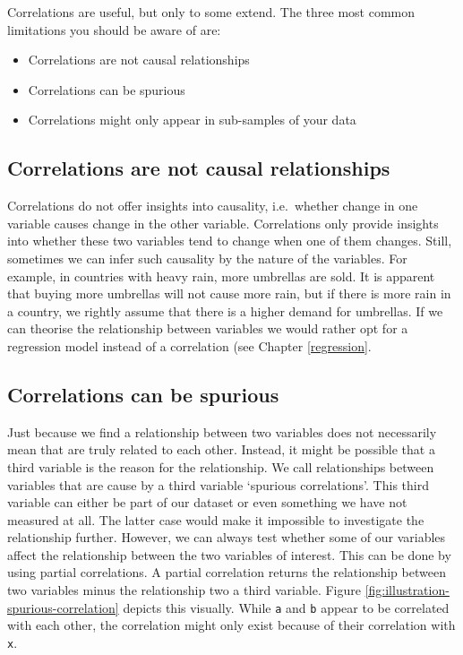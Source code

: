 \documentclass[
]{book}
\begin{document}
Correlations are useful, but only to some extend. The three most common limitations you should be aware of are:

\begin{itemize}
\item
  Correlations are not causal relationships
\item
  Correlations can be spurious
\item
  Correlations might only appear in sub-samples of your data
\end{itemize}

\hypertarget{correlations-are-not-causal-relationships}{%
\subsection{Correlations are not causal relationships}\label{correlations-are-not-causal-relationships}}

Correlations do not offer insights into causality, i.e.~whether change in one variable causes change in the other variable. Correlations only provide insights into whether these two variables tend to change when one of them changes. Still, sometimes we can infer such causality by the nature of the variables. For example, in countries with heavy rain, more umbrellas are sold. It is apparent that buying more umbrellas will not cause more rain, but if there is more rain in a country, we rightly assume that there is a higher demand for umbrellas. If we can theorise the relationship between variables we would rather opt for a regression model instead of a correlation (see Chapter \ref{regression}.

\hypertarget{correlations-can-be-spurious}{%
\subsection{Correlations can be spurious}\label{correlations-can-be-spurious}}

Just because we find a relationship between two variables does not necessarily mean that are truly related to each other. Instead, it might be possible that a third variable is the reason for the relationship. We call relationships between variables that are cause by a third variable `spurious correlations'. This third variable can either be part of our dataset or even something we have not measured at all. The latter case would make it impossible to investigate the relationship further. However, we can always test whether some of our variables affect the relationship between the two variables of interest. This can be done by using partial correlations. A partial correlation returns the relationship between two variables minus the relationship two a third variable. Figure \ref{fig:illustration-spurious-correlation} depicts this visually. While \texttt{a} and \texttt{b} appear to be correlated with each other, the correlation might only exist because of their correlation with \texttt{x}.
\end{document}
